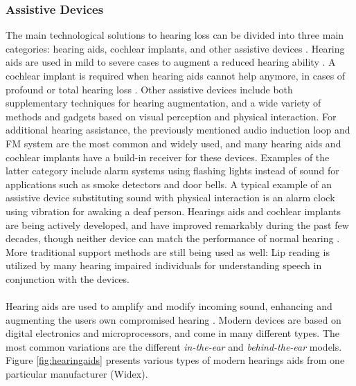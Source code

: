 \documentclass[english, 12pt, a4paper, pdftex, elec, utf8]{aaltothesis}
\begin{document}
\subsubsection{Assistive Devices}

The main technological solutions to hearing loss can be divided into three main categories: hearing aids, cochlear implants, and other assistive devices \cite{moore2007cochlear}. Hearing aids are used in mild to severe cases to augment a reduced hearing ability \cite{moore2007cochlear, levitt2007historical}. A cochlear implant is required when hearing aids cannot help anymore, in cases of profound or total hearing loss \cite{moore2007cochlear, levitt2007historical}. Other assistive devices include both supplementary techniques for hearing augmentation, and a wide variety of methods and gadgets based on visual perception and physical interaction. For additional hearing assistance, the previously mentioned audio induction loop and FM system are the most common and widely used, and many hearing aids and cochlear implants have a build-in receiver for these devices. Examples of the latter category include alarm systems using flashing lights instead of sound for applications such as smoke detectors and door bells. A typical example of an assistive device substituting sound with physical interaction is an alarm clock using vibration for awaking a deaf person. Hearings aids and cochlear implants are being actively developed, and have improved remarkably during the past few decades, though neither device can match the performance of normal hearing \cite{moore2007cochlear, levitt2007historical, goehring2016speech}. More traditional support methods are still being used as well: Lip reading is utilized by many hearing impaired individuals for understanding speech in conjunction with the devices. \\\\
Hearing aids are used to amplify and modify incoming sound, enhancing and augmenting the users own compromised hearing \cite{levitt2007historical, salonen2013hearing, fink2008benefit}. Modern devices are based on digital electronics and microprocessors, and come in many different types. The most common variations are the different \textit{in-the-ear} and \textit{behind-the-ear} models. Figure \ref{fig:hearingaids} presents various types of modern hearings aids from one particular manufacturer (Widex). \\
\end{document}
